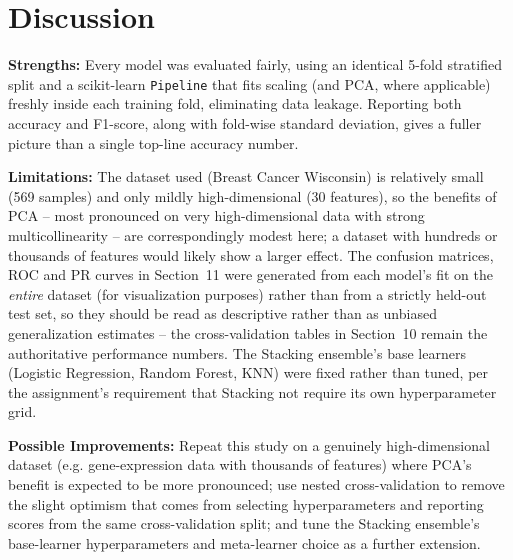 \documentclass[12pt,a4paper]{article}
\begin{document}
\section{Discussion}
\label{sec:discussion}
\textbf{Strengths:} Every model was evaluated fairly, using an identical 5-fold stratified split and a scikit-learn \texttt{Pipeline} that fits scaling (and PCA, where applicable) freshly inside each training fold, eliminating data leakage. Reporting both accuracy and F1-score, along with fold-wise standard deviation, gives a fuller picture than a single top-line accuracy number.

\textbf{Limitations:} The dataset used (Breast Cancer Wisconsin) is relatively small (569 samples) and only mildly high-dimensional (30 features), so the benefits of PCA -- most pronounced on very high-dimensional data with strong multicollinearity -- are correspondingly modest here; a dataset with hundreds or thousands of features would likely show a larger effect. The confusion matrices, ROC and PR curves in Section~11 were generated from each model's fit on the \emph{entire} dataset (for visualization purposes) rather than from a strictly held-out test set, so they should be read as descriptive rather than as unbiased generalization estimates -- the cross-validation tables in Section~10 remain the authoritative performance numbers. The Stacking ensemble's base learners (Logistic Regression, Random Forest, KNN) were fixed rather than tuned, per the assignment's requirement that Stacking not require its own hyperparameter grid.

\textbf{Possible Improvements:} Repeat this study on a genuinely high-dimensional dataset (e.g. gene-expression data with thousands of features) where PCA's benefit is expected to be more pronounced; use nested cross-validation to remove the slight optimism that comes from selecting hyperparameters and reporting scores from the same cross-validation split; and tune the Stacking ensemble's base-learner hyperparameters and meta-learner choice as a further extension.
\end{document}
